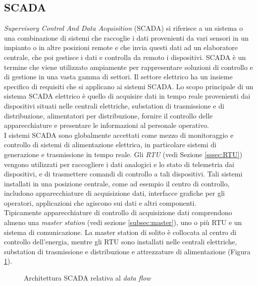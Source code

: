 \subsection{SCADA \label{subsec:SCADA}}
\emph{Supervisory Control And Data Acquisition} (SCADA) si riferisce a un sistema o una combinazione di sistemi che raccoglie i dati provenienti da vari sensori in un impianto o in altre posizioni remote e che invia questi dati ad un elaboratore centrale, che poi gestisce i dati e controlla da remoto i dispositivi. SCADA è un termine che viene utilizzato ampiamente per rappresentare soluzioni di controllo e di gestione in una vasta gamma di settori. Il settore elettrico ha un insieme specifico di requisiti che si applicano ai sistemi SCADA. Lo scopo principale di un sistema SCADA elettrico è quello di acquisire dati in tempo reale provenienti dai dispositivi situati nelle centrali elettriche, substation di trasmissione e di distribuzione, alimentatori per distribuzione, fornire il controllo delle apparecchiature e presentare le informazioni al personale operativo.  
\\
I sistemi SCADA sono globalmente accettati come mezzo di monitoraggio e controllo di sistemi di alimentazione elettrica, in particolare sistemi di generazione e trasmissione in tempo reale. Gli \emph{RTU} (vedi Sezione \ref{sssec:RTU}) vengono utilizzati per raccogliere i dati analogici e lo stato di telemetria dai dispositivi, e di trasmettere comandi di controllo a tali dispositivi. Tali sistemi installati in una posizione centrale, come ad esempio il centro di controllo, includono apparecchiature di acquisizione dati, interfacce grafiche per gli operatori, applicazioni che agiscono sui dati e altri componenti. 
\\
Tipicamente apparecchiature di controllo di acquisizione dati comprendono almeno una \emph{master station} (vedi sezione \ref{subsec:master}), uno o più RTU e un sistema di comunicazione. La master station di solito è collocata al centro di controllo dell'energia, mentre gli RTU sono installati nelle centrali elettriche, substation di trasmissione e distribuzione e attrezzature di alimentazione (Figura \ref{fig:24}).

\begin{figure}[h] 
\caption{Architettura SCADA relativa al \emph{data flow}}\label{fig:24}
\end{figure}


